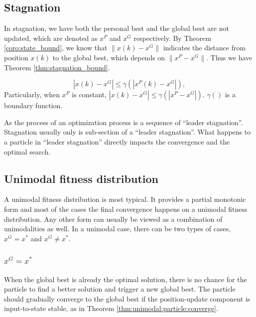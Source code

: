 \subsection{Stagnation}

In stagnation, we have both the personal best and the global best are not updated, which are denoted as $ x^{P} $ and $ x^{G} $ respectively.
By Theorem \ref{coro:state_bound}, we know that $ \lVert x(k) - x^{G} \rVert $ indicates the distance from position $ x(k) $ to the global best, which depends on  $ \lVert x^{P} - x^{G} \rVert $.
Thus we have Theorem \ref{thm:stagnation_bound}.

\begin{mythm}
\label{thm:stagnation_bound}
\begin{equation}
| x(k) - x^{G} | \leq \gamma ( | x^{P}(k) - x^{G} | ), 
\end{equation}
Particularly, when $ x^{P} $ is constant,
$  | x(k) - x^{G} | \leq \gamma ( | x^{P} - x^{G} | ). $
$ \gamma () $ is a boundary function.
\end{mythm}

As the process of an optimization process is a sequence of ``leader stagnation''.
Stagnation usually only is sub-section of a ``leader stagnation''.
What happens to a particle in ``leader stagnation'' directly impacts the convergence and the optimal search.

\subsection{Unimodal fitness distribution}

A unimodal fitness distribution is most typical.
It provides a partial monotonic form and most of the cases the final convergence happens on a unimodal fitness distribution.
Any other form can usually be viewed as a combination of unimodalities as well.
In a unimodal case, there can be two types of cases, $ x^{G} = x^{*} $ and $ x^{G} \not = x^{*} $.

\subsubsection{$ x^{G} = x^{*} $}

When the global best is already the optimal solution, there is no chance for the particle to find a better solution and trigger a new global best.
The particle should gradually converge to the global best if the position-update component is input-to-state stable, as in Theorem \ref{thm:unimodal:particle:converge}.

